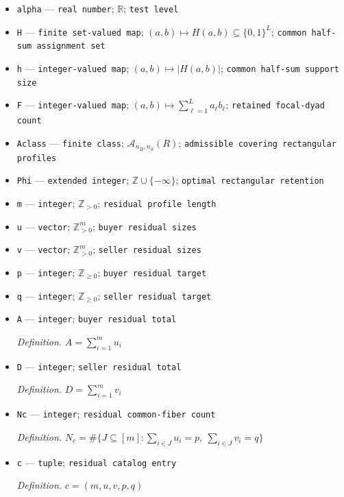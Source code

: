 \documentclass{article}
\begin{document}
\begin{itemize}
  \item \texttt{alpha} --- \texttt{real number}; \(\mathbb R\); \texttt{test level}
  \item \texttt{H} --- \texttt{finite set-\allowbreak{}valued map}; \((a,b)\mapsto H(a,b)\subseteq\{0,1\}^{L}\); \texttt{common half-\allowbreak{}sum assignment set}
  \item \texttt{h} --- \texttt{integer-\allowbreak{}valued map}; \((a,b)\mapsto |H(a,b)|\); \texttt{common half-\allowbreak{}sum support size}
  \item \texttt{F} --- \texttt{integer-\allowbreak{}valued map}; \((a,b)\mapsto\sum_{\ell=1}^{L}a_\ell b_\ell\); \texttt{retained focal-\allowbreak{}dyad count}
  \item \texttt{Aclass} --- \texttt{finite class}; \(\mathcal A_{n_B,n_S}(R)\); \texttt{admissible covering rectangular profiles}
  \item \texttt{Phi} --- \texttt{extended integer}; \(\mathbb Z\cup\{-\infty\}\); \texttt{optimal rectangular retention}
  \item \texttt{m} --- \texttt{integer}; \(\mathbb Z_{>0}\); \texttt{residual profile length}
  \item \texttt{u} --- \texttt{vector}; \(\mathbb Z_{>0}^{m}\); \texttt{buyer residual sizes}
  \item \texttt{v} --- \texttt{vector}; \(\mathbb Z_{>0}^{m}\); \texttt{seller residual sizes}
  \item \texttt{p} --- \texttt{integer}; \(\mathbb Z_{\ge0}\); \texttt{buyer residual target}
  \item \texttt{q} --- \texttt{integer}; \(\mathbb Z_{\ge0}\); \texttt{seller residual target}
  \item \texttt{A} --- \texttt{integer}; \texttt{buyer residual total}
  \par\smallskip\noindent\emph{Definition.} \(A=\sum_{i=1}^{m}u_i\)
  \item \texttt{D} --- \texttt{integer}; \texttt{seller residual total}
  \par\smallskip\noindent\emph{Definition.} \(D=\sum_{i=1}^{m}v_i\)
  \item \texttt{Nc} --- \texttt{integer}; \texttt{residual common-\allowbreak{}fiber count}
  \par\smallskip\noindent\emph{Definition.} \(N_c=\#\{J\subseteq[m]:\sum_{i\in J}u_i=p,\ \sum_{i\in J}v_i=q\}\)
  \item \texttt{c} --- \texttt{tuple}; \texttt{residual catalog entry}
  \par\smallskip\noindent\emph{Definition.} \(c=(m,u,v,p,q)\)

\end{itemize}
\end{document}
